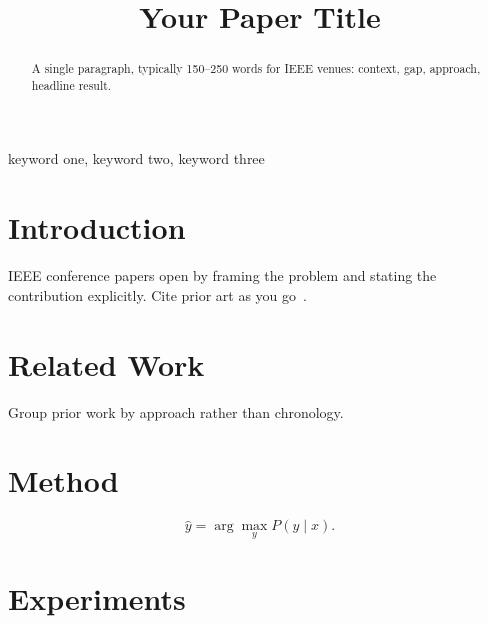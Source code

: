 \documentclass[conference]{IEEEtran}
\begin{document}
\title{Your Paper Title}

\author{
  \and
}

\maketitle

\begin{abstract}
  A single paragraph, typically 150--250 words for IEEE venues: context,
  gap, approach, headline result.
\end{abstract}

\begin{IEEEkeywords}
  keyword one, keyword two, keyword three
\end{IEEEkeywords}

\section{Introduction}
\label{sec:introduction}

IEEE conference papers open by framing the problem and stating the
contribution explicitly. Cite prior art as you go~\cite{knuth1984}.

\section{Related Work}
\label{sec:related}

Group prior work by approach rather than chronology.

\section{Method}
\label{sec:method}

\begin{equation}
  \label{eq:example}
  \hat{y} = \arg\max_{y} P(y \mid x) .
\end{equation}

\section{Experiments}
\label{sec:experiments}
\end{document}
